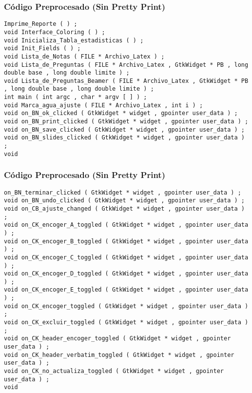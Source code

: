 \documentclass{beamer}
\begin{document}
\begin{frame}[fragile]
\frametitle{C\'odigo Preprocesado (Sin Pretty Print)}
\begin{lstlisting}[style=CStyle]
Imprime_Reporte ( ) ; 
void Interface_Coloring ( ) ; 
void Inicializa_Tabla_estadisticas ( ) ; 
void Init_Fields ( ) ; 
void Lista_de_Notas ( FILE * Archivo_Latex ) ; 
void Lista_de_Preguntas ( FILE * Archivo_Latex , GtkWidget * PB , long double base , long double limite ) ; 
void Lista_de_Preguntas_Beamer ( FILE * Archivo_Latex , GtkWidget * PB , long double base , long double limite ) ; 
int main ( int argc , char * argv [ ] ) ; 
void Marca_agua_ajuste ( FILE * Archivo_Latex , int i ) ; 
void on_BN_ok_clicked ( GtkWidget * widget , gpointer user_data ) ; 
void on_BN_print_clicked ( GtkWidget * widget , gpointer user_data ) ; 
void on_BN_save_clicked ( GtkWidget * widget , gpointer user_data ) ; 
void on_BN_slides_clicked ( GtkWidget * widget , gpointer user_data ) ; 
void \end{lstlisting}
\end{frame}
\begin{frame}[fragile]
\frametitle{C\'odigo Preprocesado (Sin Pretty Print)}
\begin{lstlisting}[style=CStyle]
on_BN_terminar_clicked ( GtkWidget * widget , gpointer user_data ) ; 
void on_BN_undo_clicked ( GtkWidget * widget , gpointer user_data ) ; 
void on_CB_ajuste_changed ( GtkWidget * widget , gpointer user_data ) ; 
void on_CK_encoger_A_toggled ( GtkWidget * widget , gpointer user_data ) ; 
void on_CK_encoger_B_toggled ( GtkWidget * widget , gpointer user_data ) ; 
void on_CK_encoger_C_toggled ( GtkWidget * widget , gpointer user_data ) ; 
void on_CK_encoger_D_toggled ( GtkWidget * widget , gpointer user_data ) ; 
void on_CK_encoger_E_toggled ( GtkWidget * widget , gpointer user_data ) ; 
void on_CK_encoger_toggled ( GtkWidget * widget , gpointer user_data ) ; 
void on_CK_excluir_toggled ( GtkWidget * widget , gpointer user_data ) ; 
void on_CK_header_encoger_toggled ( GtkWidget * widget , gpointer user_data ) ; 
void on_CK_header_verbatim_toggled ( GtkWidget * widget , gpointer user_data ) ; 
void on_CK_no_actualiza_toggled ( GtkWidget * widget , gpointer user_data ) ; 
void \end{lstlisting}
\end{frame}
\end{document}
